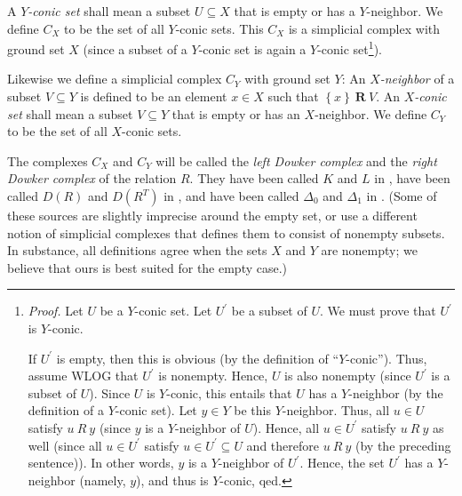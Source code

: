 \documentclass[numbers=enddot,12pt,final,onecolumn,notitlepage]{scrartcl}%
\theoremstyle{definition}
\newenvironment{verlong}{}{}
\begin{document}
\begin{verlong}
A $Y$\emph{-conic set} shall mean a subset $U\subseteq X$ that is empty or has
a $Y$-neighbor. We define $C_{X}$ to be the set of all $Y$-conic sets. This
$C_{X}$ is a simplicial complex with ground set $X$ (since a subset of a
$Y$-conic set is again a $Y$-conic set\footnote{\textit{Proof.} Let $U$ be a
$Y$-conic set. Let $U^{\prime}$ be a subset of $U$. We must prove that
$U^{\prime}$ is $Y$-conic.
\par
If $U^{\prime}$ is empty, then this is obvious (by the definition of
\textquotedblleft$Y$-conic\textquotedblright). Thus, assume WLOG that
$U^{\prime}$ is nonempty. Hence, $U$ is also nonempty (since $U^{\prime}$ is a
subset of $U$). Since $U$ is $Y$-conic, this entails that $U$ has a
$Y$-neighbor (by the definition of a $Y$-conic set). Let $y\in Y$ be this
$Y$-neighbor. Thus, all $u\in U$ satisfy $u\ R\ y$ (since $y$ is a
$Y$-neighbor of $U$). Hence, all $u\in U^{\prime}$ satisfy $u\ R\ y$ as well
(since all $u\in U^{\prime}$ satisfy $u\in U^{\prime}\subseteq U$ and
therefore $u\ R\ y$ (by the preceding sentence)). In other words, $y$ is a
$Y$-neighbor of $U^{\prime}$. Hence, the set $U^{\prime}$ has a $Y$-neighbor
(namely, $y$), and thus is $Y$-conic, qed.}).
\end{verlong}

Likewise we define a simplicial complex $C_{Y}$ with ground set $Y$: An
$X$\emph{-neighbor} of a subset $V\subseteq Y$ is defined to be an element
$x\in X$ such that $\left\{  x\right\}  \ \mathbf{R}\ V$. An $X$\emph{-conic
set} shall mean a subset $V\subseteq Y$ that is empty or has an $X$-neighbor.
We define $C_{Y}$ to be the set of all $X$-conic sets.

The complexes $C_{X}$ and $C_{Y}$ will be called the \emph{left Dowker
complex} and the \emph{right Dowker complex} of the relation $R$. They have
been called $K$ and $L$ in \cite[\S 1]{Dowker52}, have been called $D\left(
R\right)  $ and $D\left(  R^{T}\right)  $ in \cite{BruSal22}, and have been
called $\Delta_{0}$ and $\Delta_{1}$ in \cite[Theorem 10.9]{Bjorne95}.
(Some of these sources are slightly imprecise around the empty set, or use
a different notion of simplicial complexes that defines them to consist of
nonempty subsets. In substance, all definitions agree when the sets $X$
and $Y$ are nonempty; we believe that ours is best suited for the empty
case.)

\end{document}
